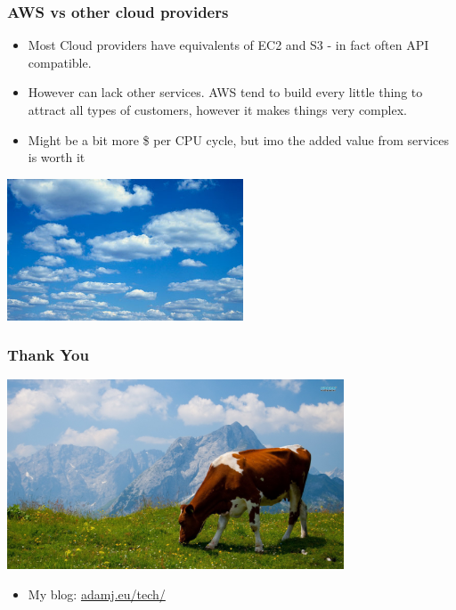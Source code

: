 \documentclass{beamer}
\begin{document}
\begin{frame}[fragile]\frametitle{AWS vs other cloud providers}

    \begin{itemize}
        \item Most Cloud providers have equivalents of EC2 and S3 - in fact often API compatible.
        \item However can lack other services. AWS tend to build every little thing to attract all types of customers, however it makes things very complex.
        \item Might be a bit more \$ per CPU cycle, but imo the added value from services is worth it
    \end{itemize}

    \begin{center}
        \includegraphics[width=7cm]{clouds}
    \end{center}

\end{frame}


\begin{frame}[fragile]\frametitle{Thank You}

    \begin{center}
        \includegraphics[width=10cm]{cow-clouds}
    \end{center}

    \begin{itemize}
        \item My blog: \url{adamj.eu/tech/}
    \end{itemize}

\end{frame}
\end{document}

